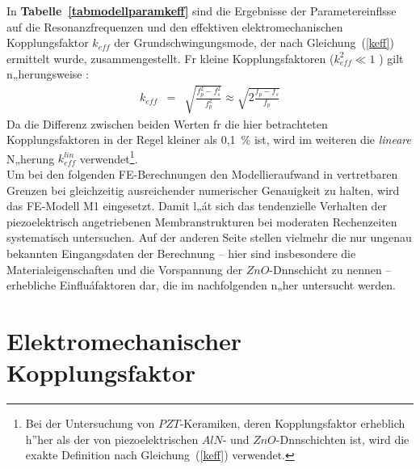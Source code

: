In {\bf Tabelle~\ref{tabmodellparamkeff}} sind die Ergebnisse der
Parametereinflsse auf die Resonanzfrequenzen und den effektiven
elektromechanischen Kopplungsfaktor $k_{eff}$ der Grundschwingungsmode, der
nach Gleichung~(\ref{keff}) ermittelt wurde, zusammengestellt. Fr kleine
Kopplungsfaktoren ($k_{eff}^{2} \ll 1$ ) gilt n„herungsweise \cite{Sie81}:
%
\begin{eqnarray}
\label{keffnaeherung}
 k_{eff} & = & \sqrt{ \frac{f_{p}^{2} - f_{s}^{2}}{f_{p}^{2}}}
            \approx \sqrt{ 2 \frac{f_{p} - f_{s}}{f_{p}}}
\end{eqnarray}
%
Da die Differenz zwischen beiden Werten fr die hier betrachteten
Kopplungsfaktoren in der Regel kleiner als 0,1~\% ist, wird im weiteren
die {\em lineare} N„herung $k^{lin}_{eff}$ verwendet\footnote{Bei
der Untersuchung von $PZT$-Keramiken, deren Kopplungsfaktor erheblich h”her
als der von piezoelektrischen $AlN$- und $ZnO$-Dnnschichten ist, wird die
exakte Definition nach Gleichung~(\ref{keff}) verwendet.}.\\
Um bei den folgenden FE-Berechnungen den Modellieraufwand in vertretbaren
Grenzen bei gleichzeitig ausreichender numerischer Genauigkeit zu halten,
wird das FE-Modell M1 eingesetzt. Damit l„át sich das tendenzielle Verhalten
der piezoelektrisch angetriebenen Membranstrukturen bei moderaten
Rechenzeiten systematisch untersuchen. Auf der anderen Seite stellen
vielmehr die nur ungenau bekannten Eingangsdaten der Berechnung --
hier sind insbesondere die Materialeigenschaften und die Vorspannung der
$ZnO$-Dnnschicht zu nennen -- erhebliche Einfluáfaktoren dar, die im
nachfolgenden n„her untersucht werden.



\section{Elektromechanischer Kopplungsfaktor}
\label{elektromech}

